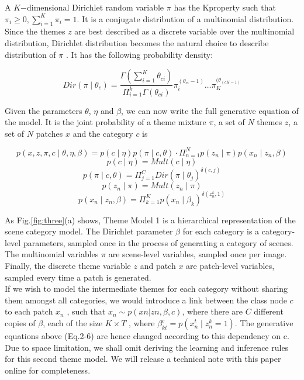 \documentclass[10pt,a4paper,twocolumn]{article}
\begin{document}
\hspace{.5cm}A $K$−dimensional Dirichlet random variable $π$ has the Kproperty such that $\pi_i \geq 0, \sum_{i=1}^{K} \pi_i = 1$. It is a conjugate distribution of a multinomial distribution. Since the themes $z$ are best described as a discrete variable over the multinomial distribution, Dirichlet distribution becomes the natural choice to describe distribution of $\pi$ \cite{gelman}. It has the following probability density:

\begin{equation}
Dir(\pi \mid \theta_c)= \frac{\Gamma(\sum_{i=1}^{K} \theta_{ci})}{\Pi_{i=1}^{k} \Gamma(\theta_{ci})} \pi_{i}^{(\theta_{ci}-1)}\ldots\pi_{K}^{(\theta_(cK-1)}
\end{equation}

Given the parameters $\theta$, $\eta$ and $\beta$, we can now write the full generative equation of the model. It is the joint probability of a theme mixture $\pi$, a set of $N$ themes $z$, a set of $N$ patches $x$ and the category $c$ is

\begin{equation} \label{eq:fst}
p(x, z, \pi, c \mid \theta, \eta, \beta)=p(c\mid\eta)p(\pi\mid c, \theta)\cdot \Pi_{n=1}^{N}p(z_{n}\mid\pi)p(x_{n}\mid z_{n}, \beta)
\end{equation}
\begin{equation}
p(c\mid\eta)=Mult(c\mid\eta)
\end{equation}
\begin{equation}
p(\pi\mid c, \theta)=\Pi_{j=1}^{C} Dir(\pi\mid\theta_{j})^{\delta(c, j)}
\end{equation}
\begin{equation}
p(z_n\mid\pi)=Mult(z_n\mid\pi)
\end{equation}
\begin{equation}
p(x_n\mid z_n, \beta)= \Pi_{k=1}^K p(x_n\mid\beta_k)^{\delta(z_n^k, 1)}
\end{equation}

As Fig.\ref{fig:three}(a) shows, Theme Model 1 is a hierarchical representation of the scene category model. The Dirichlet parameter $\beta$ for each category is a category-level parameters, sampled once in the process of generating a category of scenes. The multinomial variables $\pi$ are scene-level variables, sampled once per image. Finally, the discrete theme variable $z$ and patch $x$ are patch-level variables, sampled every time a patch is generated.\\
If we wish to model the intermediate themes for each
category without sharing them amongst all categories, we
would introduce a link between the class node $c$ to each
patch $x_n$ , such that $x_n \sim p(xn |zn , β, c)$, where there are $C$
different copies of $\beta$, each of the size $K \times T$ , where $β_{kt}^c=p(x_n^t\mid z_n^k=1)$. The generative equations above (Eq.2-6) are hence changed according to this dependency on c. Due to space limitation, we shall omit deriving the learning and inference rules for this second theme model. We will release a technical note with this paper online for completeness.
\end{document}
